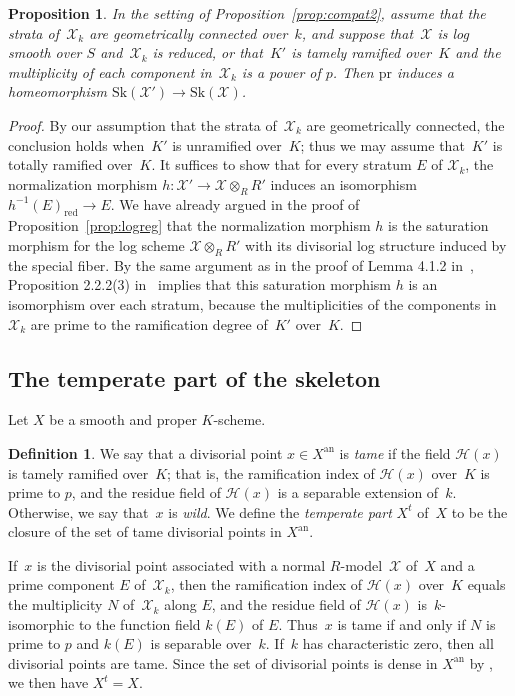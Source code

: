 \documentclass[JEP,XML,SOM,Unicode,NoFloatCountersInSection]{cedram}
\newtheorem{prop}[equation]{Proposition}
\theoremstyle{definition}
\newtheorem{definition}[equation]{Definition}
\numberwithin{equation}{subsection}
\newcommand{\cX}{\ensuremath{\mathscr{X}}}
\newcommand{\an}{\mathrm{an}}
\newcommand{\pr}{\mathrm{pr}}
\newcommand{\red}{\mathrm{red}}
\newcommand{\Sk}{\mathrm{Sk}}
\begin{document}
\begin{prop}\label{prop:compat5}
In the setting of Proposition~\ref{prop:compat2}, assume that the strata of~$\cX_k$ are geometrically connected over~$k$, and suppose that~$\cX$ is log smooth over $S$ and~$\cX_k$ is reduced, or that~$K'$ is tamely ramified over~$K$ and the multiplicity of each component in~$\cX_k$ is a power of $p$. Then $\pr$ induces a homeomorphism $\Sk(\cX')\to \Sk(\cX)$.
\end{prop}
\begin{proof}
By our assumption that the strata of~$\cX_k$ are geometrically connected, the conclusion holds when~$K'$ is unramified over~$K$; thus we may assume that~$K'$ is totally ramified over~$K$.
It suffices to show that for every stratum $E$ of
$\cX_k$,
the normalization morphism $h\colon \cX'\to \cX\otimes_R R'$ induces an isomorphism $h^{-1}(E)_{\red}\to E$.
We have already argued in the proof of Proposition~\ref{prop:logreg} that the normalization morphism $h$ is the saturation morphism for the log scheme $\cX\otimes_R R'$ with its divisorial log structure induced by the special fiber.
By the same argument as in the proof of Lemma 4.1.2 in~\cite{logzeta}, Proposition 2.2.2(3) in~\cite{logzeta} implies that this saturation morphism $h$ is an isomorphism over each stratum, because the multiplicities of the components in~$\cX_k$ are prime to the ramification degree of~$K'$ over~$K$.
\end{proof}

\subsection{The temperate part of the skeleton}\label{ss:tamepart}
Let $X$ be a smooth and proper $K$\nobreakdash-scheme.
\begin{definition}
We say that a divisorial point $x\in X^{\an}$ is {\em tame} if the field
$\mathscr{H}(x)$ is tamely ramified over~$K$; that is, the ramification index of $\mathscr{H}(x)$ over~$K$ is prime to $p$, and the residue field of $\mathscr{H}(x)$ is a separable extension of~$k$.
Otherwise, we say that~$x$ is {\em wild}.
We define the {\em temperate part} $X^t$ of~$X$ to be the closure of the set of tame divisorial points in $X^{\an}$.
\end{definition}

If~$x$ is the divisorial point associated with a normal $R$\nobreakdash-model~$\cX$ of~$X$ and a prime component $E$ of~$\cX_k$, then the ramification index of $\mathscr{H}(x)$ over~$K$ equals the multiplicity $N$ of~$\cX_k$ along $E$, and the residue field of
$\mathscr{H}(x)$ is~$k$-isomorphic to the function field $k(E)$ of $E$. Thus~$x$ is tame if and only if $N$ is prime to $p$ and $k(E)$ is separable over~$k$.
If~$k$ has characteristic zero, then all divisorial points are tame. Since the set of divisorial points is dense in $X^{\an}$ by \cite[2.4.9]{MuNi}, we then have $X^t=X$.
\end{document}
